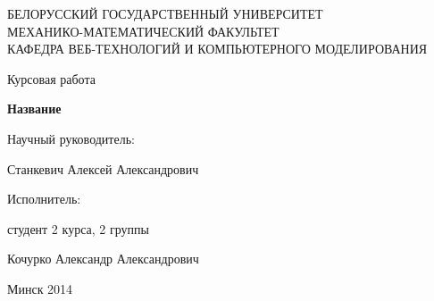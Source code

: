 \begin{titlepage}
\newpage

\begin{center}
БЕЛОРУССКИЙ ГОСУДАРСТВЕННЫЙ УНИВЕРСИТЕТ \\
МЕХАНИКО-МАТЕМАТИЧЕСКИЙ ФАКУЛЬТЕТ\\
КАФЕДРА ВЕБ-ТЕХНОЛОГИЙ И КОМПЬЮТЕРНОГО МОДЕЛИРОВАНИЯ
\end{center}
 
\vspace{14em}

\begin{center}
Курсовая работа
\end{center}

\begin{center}
\Large \textbf{Название}
\end{center}

\vspace{11em}
 
\begin{flushright}
\parbox{0.45\textwidth}{
Научный руководитель:
\vspace{0.25em}

Станкевич Алексей Александрович
\vspace{2em}

Исполнитель:
\vspace{0.25em}

студент 2 курса, 2 группы

Кочурко Александр Александрович
}%
\end{flushright}
 
\vspace{\fill}

\begin{center}
Минск 2014
\end{center}

\end{titlepage} 
